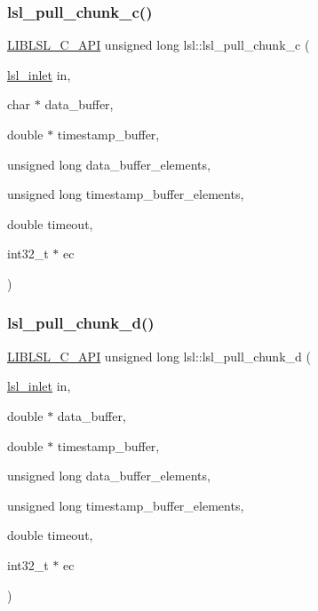 \subsubsection{\texorpdfstring{lsl\+\_\+pull\+\_\+chunk\+\_\+c()}{lsl\_pull\_chunk\_c()}}
{\footnotesize\ttfamily \hyperlink{lsl__cpp_8h_aafd0ef1813e8be84a1420c4f1df64615}{L\+I\+B\+L\+S\+L\+\_\+\+C\+\_\+\+A\+PI} unsigned long lsl\+::lsl\+\_\+pull\+\_\+chunk\+\_\+c (\begin{DoxyParamCaption}\item[{\hyperlink{namespacelsl_a884a3363cfcba75d7ce8f00c1c4c54f1}{lsl\+\_\+inlet}}]{in,  }\item[{char $\ast$}]{data\+\_\+buffer,  }\item[{double $\ast$}]{timestamp\+\_\+buffer,  }\item[{unsigned long}]{data\+\_\+buffer\+\_\+elements,  }\item[{unsigned long}]{timestamp\+\_\+buffer\+\_\+elements,  }\item[{double}]{timeout,  }\item[{int32\+\_\+t $\ast$}]{ec }\end{DoxyParamCaption})}

\mbox{\label{namespacelsl_ad8e4cbb24fb74cd532abf50fe3a8d571}} 
\subsubsection{\texorpdfstring{lsl\+\_\+pull\+\_\+chunk\+\_\+d()}{lsl\_pull\_chunk\_d()}}
{\footnotesize\ttfamily \hyperlink{lsl__cpp_8h_aafd0ef1813e8be84a1420c4f1df64615}{L\+I\+B\+L\+S\+L\+\_\+\+C\+\_\+\+A\+PI} unsigned long lsl\+::lsl\+\_\+pull\+\_\+chunk\+\_\+d (\begin{DoxyParamCaption}\item[{\hyperlink{namespacelsl_a884a3363cfcba75d7ce8f00c1c4c54f1}{lsl\+\_\+inlet}}]{in,  }\item[{double $\ast$}]{data\+\_\+buffer,  }\item[{double $\ast$}]{timestamp\+\_\+buffer,  }\item[{unsigned long}]{data\+\_\+buffer\+\_\+elements,  }\item[{unsigned long}]{timestamp\+\_\+buffer\+\_\+elements,  }\item[{double}]{timeout,  }\item[{int32\+\_\+t $\ast$}]{ec }\end{DoxyParamCaption})}

